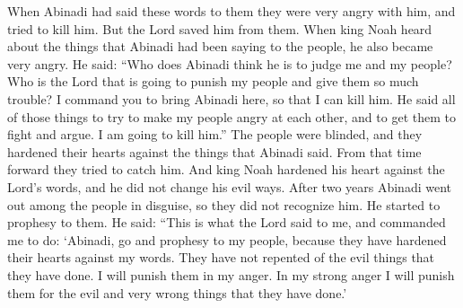 When Abinadi had said these words to them they were very angry with him, and tried to kill him. But the Lord saved him from them.
\bverse \iffalse Now when king Noah had heard of the words which Abinadi had spoken unto the people, he was also wroth; and he said: Who is Abinadi, that I and my people should be judged of him, or who is the Lord, that shall bring upon my people such great affliction? \fi
When king Noah heard about the things that Abinadi had been saying to the people, he also became very angry. He said: ``Who does Abinadi think he is to judge me and my people? Who is the Lord that is going to punish my people and give them so much trouble?
\bverse \iffalse I command you to bring Abinadi hither, that I may slay him, for he has said these things that he might stir up my people to anger one with another, and to raise contentions among my people; therefore I will slay him. \fi
I command you to bring Abinadi here, so that I can kill him. He said all of those things to try to make my people angry at each other, and to get them to fight and argue. I am going to kill him.''
\bverse \iffalse Now the eyes of the people were blinded; therefore they hardened their hearts against the words of Abinadi, and they sought from that time forward to take him. And king Noah hardened his heart against the word of the Lord, and he did not repent of his evil doings. \fi
The people were blinded, and they hardened their hearts against the things that Abinadi said. From that time forward they tried to catch him. And king Noah hardened his heart against the Lord's words, and he did not change his evil ways.
\bchapter
\bverse \iffalse And it came to pass that after the space of two years that Abinadi came among them in disguise, that they knew him not, and began to prophesy among them, saying: Thus has the Lord commanded me, saying--Abinadi, go and prophesy unto this my people, for they have hardened their hearts against my words; they have repented not of their evil doings; therefore, I will visit them in my anger, yea, in my fierce anger will I visit them in their iniquities and abominations. \fi
After two years Abinadi went out among the people in disguise, so they did not recognize him. He started to prophesy to them. He said: ``This is what the Lord said to me, and commanded me to do: \lq Abinadi, go and prophesy to my people, because they have hardened their hearts against my words. They have not repented of the evil things that they have done. I will punish them in my anger. In my strong anger I will punish them for the evil and very wrong things that they have done.\rq
